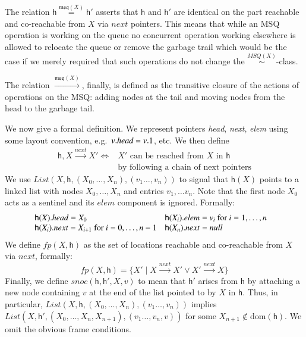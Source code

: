 \documentclass[nocopyrightspace,preprint]{sigplanconf}
\newcommand{\dom}[1]{\mathrm{dom}({#1})}
\newcommand{\locMSQ}{\ensuremath{\mathfrak{msq}}\xspace}
\newcommand{\cloc}{\ensuremath{X}\xspace}
\newcommand\heap{\ensuremath{\mathsf{h}}\xspace}
\newcommand\h{\heap}
\newcommand\rloc[3]{\ensuremath{#1 \stackrel{#3}{\sim} #2}}
\newcommand\rrloc[3]{\ensuremath{#1 \stackrel{#3}{=} #2}}
\newcommand\gloc[3]{\ensuremath{#1 \xrightarrow{#3}#2}}
\begin{document}
The relation $\rrloc{\heap}{\heap'}{\locMSQ(\cloc)}$ asserts that $\heap$ and $\heap'$ are identical on the part reachable and co-reachable from $\cloc$ via $\textit{next}$ pointers. This means that while an MSQ operation is working on the queue no concurrent operation working elsewhere is allowed to relocate the queue or remove the garbage trail which would be the case if we merely required that such operations do not change the 
$\rloc{}{}{MSQ(\cloc)}$-class.

The relation $\gloc{}{}{\locMSQ(\cloc)}$, finally, is defined as the
transitive closure of the actions of operations on the MSQ: adding
nodes at the tail and moving nodes from the head to the garbage tail.

We now give a formal definition. We represent pointers \emph{head},
\emph{next}, \emph{elem} using some layout convention,
e.g.\ $v.\emph{head}=v.1$, etc. We then define
 \[
 \begin{array}{ll}
  \h,\cloc\stackrel{\mathit{next}}{\to} \cloc' \iff & \cloc' \textrm{ can be reached 
  from $\cloc$ in $\h$} \\ &
  \textrm{by following a chain of next pointers}  
 \end{array}
 \]
We use
$\textit{List}(\cloc,\h,(\cloc_0,\ldots,\cloc_n),(v_1\ldots,v_n))$ to
signal that $\h(\cloc)$ points to a linked list with nodes
$X_0,\dots,X_n$ and entries $v_1,\dots v_n$. Note that the first node
$X_0$ acts as a sentinel and its $elem$ component is
ignored. Formally:
 \[
 \hspace{-3mm}
  \begin{array}{l@{\quad}l}
   \h(\cloc).head = \cloc_0 &
   \h(\cloc_i).elem = v_i \textrm{ for $i=1,\ldots, n$}\\
   \h(\cloc_i).next = \cloc_{i+1}  \textrm{ for $i=0,\ldots, n-1$}&
   \h(\cloc_n).next = null
  \end{array}
 \]
We define $\textit{fp}(\cloc,\h)$ as the set of locations reachable and co-reachable from $\cloc$ via $\textit{next}$, formally: 
\[
\textit{fp}(\cloc,\h)=\{\cloc'\mid \cloc\stackrel{\mathit{next}}{\to} \cloc'\vee\cloc'\stackrel{\mathit{next}}{\to} \cloc\}
\]
Finally, we define $\textit{snoc}(\h,\h',\cloc,v)$ to mean that $\h'$ arises from $\h$ by attaching a new node containing $v$ at the end of the list pointed to by $\cloc$ in $\h$. Thus, in particular, $\textit{List}(\cloc,\h,(\cloc_0,\ldots,\cloc_n),(v_1\ldots,v_n))$ implies $\textit{List}(\cloc,\h',(\cloc_0,\ldots,\cloc_n,\cloc_{n+1}),(v_1\ldots,v_n,v))$ for some $\cloc_{n+1}\not\in\dom{\h}$. We omit the obvious frame conditions. 
\end{document}
